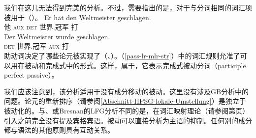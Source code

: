 我们在这儿无法得到完美的分析。不过，需要指出的是，对于与分词相同的词汇项被用于（）。
\eal
\ex 
\gll Er hat den Weltmeister geschlagen.\\
	 他 \textsc{aux} \textsc{det} 世界.冠军 打\\
\ex 
\gll Der Weltmeister wurde geschlagen.\\
	 \textsc{det} 世界.冠军 \textsc{aux} 打\\
\zl
助动词决定了哪些论元被实现了（\citealp{Haider86}、\citealp[\S~17]{MuellerLehrbuch1}）。（\ref{pass-lr-mlr-str}）中的词汇规则允准了可以用在被动和完成式中的形式。这样，\vformvc 属于，它表示完成式被动分词（participle perfect passive）。

我们应该注意到，该分析适用于没有成分移动的被动。这里没有涉及GB分析中的问题\indexgbc。论元的重新排序（请参阅\ref{Abschnitt-HPSG-lokale-Umstellung}）是独立于被动化的。与\gpsgc、\cgc 或Bresnan的LFG分析\indexlfgc 不同的是，在词汇映射理论（请参阅第\pageref{page-LMT}页）引入之前完全没有提及宾格宾语。被动可以直接分析为主语的抑制。任何别的成分都与语法的其他原则具有互动关系。

